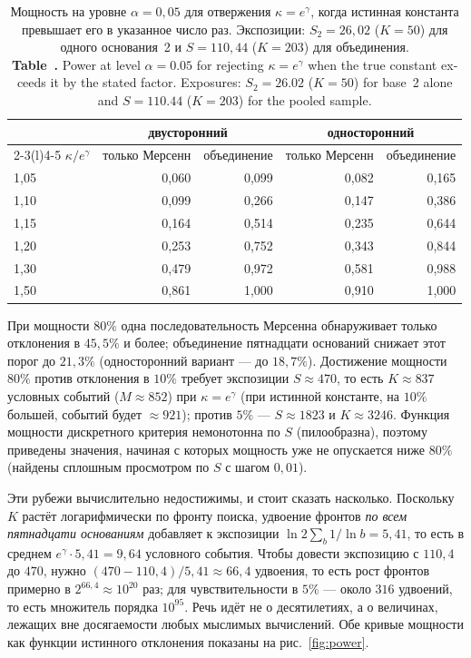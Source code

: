 \documentclass[11pt,a4paper]{article}
\newcommand{\encaptab}[1]{\\[3pt]\foreignlanguage{english}{%
  \textbf{Table~\thetable.} #1}}
\theoremstyle{plain}
\theoremstyle{remark}
\newcommand{\eg}{e^{\gamma}}
\begin{document}
\begin{table}[t]
\centering
\caption{Мощность на уровне $\alpha=0{,}05$ для отвержения $\kappa=\eg$, когда истинная
константа превышает его в указанное число раз. Экспозиции: $S_2=26{,}02$ ($K=50$)
для одного основания~2 и $S=110{,}44$ ($K=203$) для объединения.
\encaptab{Power at level $\alpha=0.05$ for rejecting $\kappa=\eg$ when the true
constant exceeds it by the stated factor. Exposures: $S_2=26.02$ ($K=50$) for base~2
alone and $S=110.44$ ($K=203$) for the pooled sample.}}
\label{tab:power}
\small
\begin{tabular}{lrr@{\qquad}rr}
\toprule
& \multicolumn{2}{c}{двусторонний} & \multicolumn{2}{c}{односторонний}\\
\cmidrule(r){2-3}\cmidrule(l){4-5}
$\kappa/\eg$ & только Мерсенн & объединение & только Мерсенн & объединение\\
\midrule
1{,}05 & 0{,}060 & 0{,}099 & 0{,}082 & 0{,}165\\
1{,}10 & 0{,}099 & 0{,}266 & 0{,}147 & 0{,}386\\
1{,}15 & 0{,}164 & 0{,}514 & 0{,}235 & 0{,}644\\
1{,}20 & 0{,}253 & 0{,}752 & 0{,}343 & 0{,}844\\
1{,}30 & 0{,}479 & 0{,}972 & 0{,}581 & 0{,}988\\
1{,}50 & 0{,}861 & 1{,}000 & 0{,}910 & 1{,}000\\
\bottomrule
\end{tabular}
\end{table}

При мощности $80\%$ одна последовательность Мерсенна обнаруживает только отклонения
в $45{,}5\%$ и более; объединение пятнадцати оснований снижает этот порог до $21{,}3\%$
(односторонний вариант --- до $18{,}7\%$).
Достижение мощности $80\%$ против отклонения в $10\%$ требует экспозиции
$S\approx470$, то есть $K\approx837$ условных событий ($M\approx852$) при
$\kappa=\eg$ (при истинной константе, на $10\%$ большей, событий будет $\approx921$);
против $5\%$ --- $S\approx1823$ и $K\approx3246$. Функция мощности дискретного
критерия немонотонна по $S$ (пилообразна), поэтому приведены значения, начиная
с которых мощность уже не опускается ниже $80\%$ (найдены сплошным просмотром по
$S$ с шагом $0{,}01$).

Эти рубежи вычислительно недостижимы, и стоит сказать насколько. Поскольку $K$ растёт
логарифмически по фронту поиска, удвоение фронтов \emph{по всем пятнадцати основаниям}
добавляет к экспозиции $\ln2\sum_b1/\ln b=5{,}41$, то есть в среднем
$\eg\cdot5{,}41=9{,}64$ условного события. Чтобы довести экспозицию с $110{,}4$ до
$470$, нужно $(470-110{,}4)/5{,}41\approx66{,}4$ удвоения, то есть рост фронтов
примерно в $2^{66{,}4}\approx10^{20}$ раз; для чувствительности в $5\%$ --- около
$316$ удвоений, то есть множитель порядка $10^{95}$. Речь идёт
не о десятилетиях, а о величинах, лежащих вне досягаемости любых мыслимых вычислений.
Обе кривые мощности как функции истинного отклонения показаны на
рис.~\ref{fig:power}.
\end{document}
